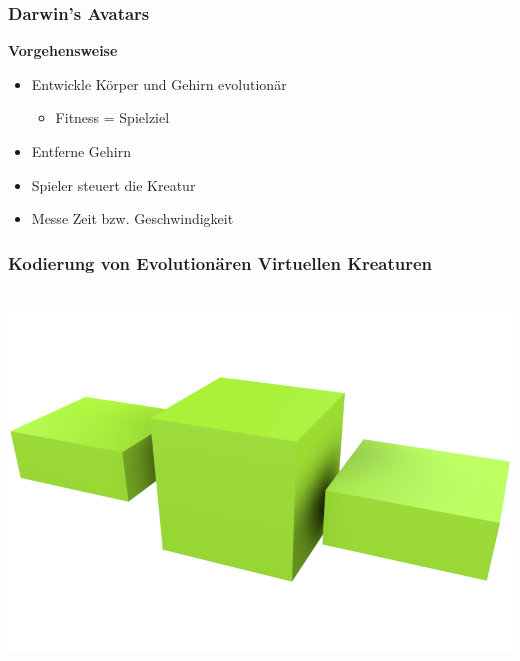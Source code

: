 \documentclass{beamer}
\begin{document}
\begin{frame}
	\frametitle{Darwin's Avatars}
	\textbf{Vorgehensweise}\\ \pause
	\begin{itemize}
		\item Entwickle Körper und Gehirn evolutionär \pause
		\begin{itemize}
			\item Fitness = Spielziel \pause
		\end{itemize} 
		\item Entferne Gehirn \pause
		\item Spieler steuert die Kreatur \pause
		\item Messe Zeit bzw. Geschwindigkeit
	\end{itemize}	
\end{frame}

\begin{frame}
	\frametitle{Kodierung von Evolutionären Virtuellen Kreaturen}
	\begin{columns}[c]
		\centering
		\pause
		\centering
		\includegraphics[width=\textwidth]{img/1.png}
	\end{columns}
\end{frame}
\end{document}
